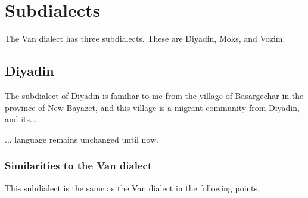 \begin{table}[H]
	\centering
	\caption{Participles or converbs <> for the verb `to want' in the Van dialect}
	\label{tab:Van:morpho:verb:paradigm:participle}
\end{table}
\section{Subdialects}
The Van dialect has three subdialects. These are Diyadin, Moks, and Vozim. 

\subsection{Diyadin}
The subdialect of Diyadin is familiar to me from the village of Basargechar in the province of New Bayazet, and this village is a migrant community from Diyadin, and its... 



\begin{adjarianpage}\label{page:146}\end{adjarianpage}%

... language remains unchanged until now. 

\subsubsection{Similarities to the Van dialect}
This subdialect is the same as the Van dialect in the following points. 



